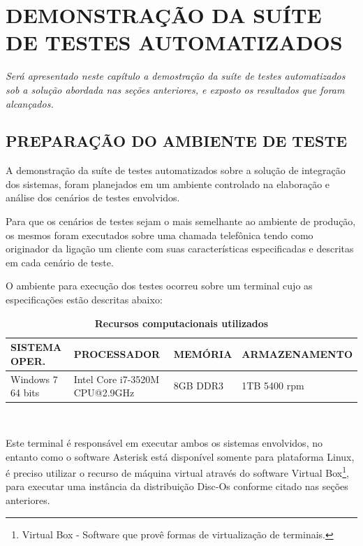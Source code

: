 \chapter[Demonstração da Suíte de Testes Automatizados]{\textbf{\uppercase{Demonstração da Suíte de Testes Automatizados}}}

\textit{Será apresentado neste capítulo a demostração da suíte de testes automatizados sob a solução abordada nas seções anteriores, e exposto os resultados que foram alcançados.}


\section{\textbf{\uppercase{Preparação do Ambiente de teste}}}

A demonstração da suíte de testes automatizados sobre a solução de integração dos sistemas, foram planejados em um ambiente controlado na elaboração e análise dos cenários de testes envolvidos. 

Para que os cenários de testes sejam o mais semelhante ao ambiente de produção, os mesmos foram executados sobre uma chamada telefônica tendo como originador da ligação um cliente com suas características especificadas e descritas em cada cenário de teste. 

O ambiente para execução dos testes ocorreu sobre um terminal cujo as especificações estão descritas abaixo:

\begin{table}[htb]
	\footnotesize
	\caption{\textbf{Recursos computacionais utilizados}}
	\label{tabela:recursosUtilizados}
	\begin{tabular}{|p{3.5cm}|p{3cm}|p{2cm}|p{4cm}|} \hline
		\textbf{SISTEMA OPER.} 	& \textbf{PROCESSADOR} 				& \textbf{MEMÓRIA} 	& \textbf{ARMAZENAMENTO}  \\ \hline
		Windows 7 64 bits 		& Intel Core i7-3520M CPU@2.9GHz 	& 8GB DDR3			& 1TB 5400 rpm \\ \hline
	\end{tabular}\\[6pt]
	\fontsize{10}{12}\selectfont {Fonte: Autoria Própria.}
\end{table}

Este terminal é responsável em executar ambos os sistemas envolvidos, no entanto como o software Asterisk está disponível somente para plataforma Linux, é preciso utilizar o recurso de máquina virtual através do software Virtual Box\footnote{Virtual Box - Software que provê formas de virtualização de terminais.}, para executar uma instância da distribuição Disc-Os conforme citado nas seções anteriores.
 

